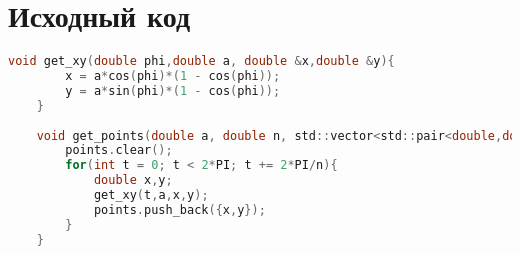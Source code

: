 \section{Исходный код}

\begin{lstlisting}[language=C]
    void get_xy(double phi,double a, double &x,double &y){
        x = a*cos(phi)*(1 - cos(phi));
        y = a*sin(phi)*(1 - cos(phi));
    }
    
    void get_points(double a, double n, std::vector<std::pair<double,double>> &points){
        points.clear();
        for(int t = 0; t < 2*PI; t += 2*PI/n){
            double x,y;
            get_xy(t,a,x,y);
            points.push_back({x,y});
        }
    }
\end{lstlisting}




